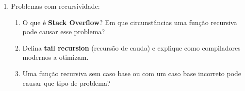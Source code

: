 \documentclass[a4paper,11pt]{report}
\begin{document}
\begin{enumerate}
\item Problemas com recursividade:

\begin{enumerate}
 \item[a)] O que é \textbf{Stack Overflow}? Em que circunstâncias uma função recursiva pode causar esse problema?
 
 \item[b)] Defina \textbf{tail recursion} (recursão de cauda) e explique como compiladores modernos a otimizam.
 
 \item[c)] Uma função recursiva sem caso base ou com um caso base incorreto pode causar que tipo de problema?
\end{enumerate}

\end{enumerate}
\end{document}

